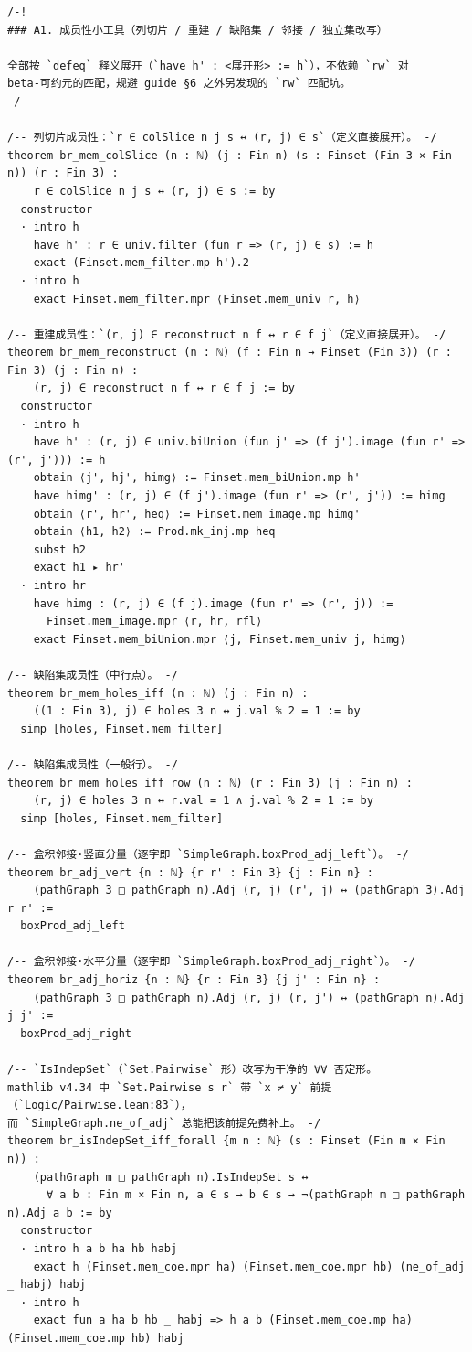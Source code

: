 \documentclass[11pt]{article}
\begin{document}
\begin{lstlisting}
/-!
### A1. 成员性小工具（列切片 / 重建 / 缺陷集 / 邻接 / 独立集改写）

全部按 `defeq` 释义展开（`have h' : <展开形> := h`），不依赖 `rw` 对
beta-可约元的匹配，规避 guide §6 之外另发现的 `rw` 匹配坑。
-/

/-- 列切片成员性：`r ∈ colSlice n j s ↔ (r, j) ∈ s`（定义直接展开）。 -/
theorem br_mem_colSlice (n : ℕ) (j : Fin n) (s : Finset (Fin 3 × Fin n)) (r : Fin 3) :
    r ∈ colSlice n j s ↔ (r, j) ∈ s := by
  constructor
  · intro h
    have h' : r ∈ univ.filter (fun r => (r, j) ∈ s) := h
    exact (Finset.mem_filter.mp h').2
  · intro h
    exact Finset.mem_filter.mpr ⟨Finset.mem_univ r, h⟩

/-- 重建成员性：`(r, j) ∈ reconstruct n f ↔ r ∈ f j`（定义直接展开）。 -/
theorem br_mem_reconstruct (n : ℕ) (f : Fin n → Finset (Fin 3)) (r : Fin 3) (j : Fin n) :
    (r, j) ∈ reconstruct n f ↔ r ∈ f j := by
  constructor
  · intro h
    have h' : (r, j) ∈ univ.biUnion (fun j' => (f j').image (fun r' => (r', j'))) := h
    obtain ⟨j', hj', himg⟩ := Finset.mem_biUnion.mp h'
    have himg' : (r, j) ∈ (f j').image (fun r' => (r', j')) := himg
    obtain ⟨r', hr', heq⟩ := Finset.mem_image.mp himg'
    obtain ⟨h1, h2⟩ := Prod.mk_inj.mp heq
    subst h2
    exact h1 ▸ hr'
  · intro hr
    have himg : (r, j) ∈ (f j).image (fun r' => (r', j)) :=
      Finset.mem_image.mpr ⟨r, hr, rfl⟩
    exact Finset.mem_biUnion.mpr ⟨j, Finset.mem_univ j, himg⟩

/-- 缺陷集成员性（中行点）。 -/
theorem br_mem_holes_iff (n : ℕ) (j : Fin n) :
    ((1 : Fin 3), j) ∈ holes 3 n ↔ j.val % 2 = 1 := by
  simp [holes, Finset.mem_filter]

/-- 缺陷集成员性（一般行）。 -/
theorem br_mem_holes_iff_row (n : ℕ) (r : Fin 3) (j : Fin n) :
    (r, j) ∈ holes 3 n ↔ r.val = 1 ∧ j.val % 2 = 1 := by
  simp [holes, Finset.mem_filter]

/-- 盒积邻接·竖直分量（逐字即 `SimpleGraph.boxProd_adj_left`）。 -/
theorem br_adj_vert {n : ℕ} {r r' : Fin 3} {j : Fin n} :
    (pathGraph 3 □ pathGraph n).Adj (r, j) (r', j) ↔ (pathGraph 3).Adj r r' :=
  boxProd_adj_left

/-- 盒积邻接·水平分量（逐字即 `SimpleGraph.boxProd_adj_right`）。 -/
theorem br_adj_horiz {n : ℕ} {r : Fin 3} {j j' : Fin n} :
    (pathGraph 3 □ pathGraph n).Adj (r, j) (r, j') ↔ (pathGraph n).Adj j j' :=
  boxProd_adj_right

/-- `IsIndepSet`（`Set.Pairwise` 形）改写为干净的 ∀∀ 否定形。
mathlib v4.34 中 `Set.Pairwise s r` 带 `x ≠ y` 前提（`Logic/Pairwise.lean:83`），
而 `SimpleGraph.ne_of_adj` 总能把该前提免费补上。 -/
theorem br_isIndepSet_iff_forall {m n : ℕ} (s : Finset (Fin m × Fin n)) :
    (pathGraph m □ pathGraph n).IsIndepSet s ↔
      ∀ a b : Fin m × Fin n, a ∈ s → b ∈ s → ¬(pathGraph m □ pathGraph n).Adj a b := by
  constructor
  · intro h a b ha hb habj
    exact h (Finset.mem_coe.mpr ha) (Finset.mem_coe.mpr hb) (ne_of_adj _ habj) habj
  · intro h
    exact fun a ha b hb _ habj => h a b (Finset.mem_coe.mp ha) (Finset.mem_coe.mp hb) habj


\end{lstlisting}
\end{document}
